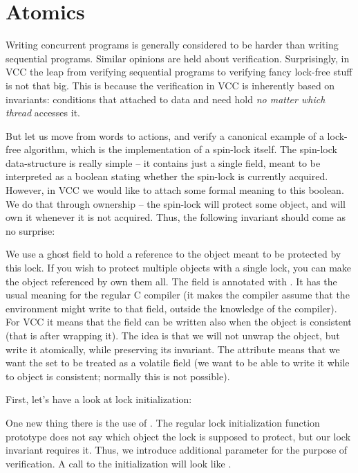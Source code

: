 \section{Atomics}
\label{sect:concurrency}

Writing concurrent programs is generally considered to be harder than writing
sequential programs.
Similar opinions are held about verification.
Surprisingly, in VCC the leap from verifying sequential programs to
verifying fancy lock-free stuff is not that big.
This is because the verification in VCC is inherently based on invariants:
conditions that attached to data and need hold \emph{no matter which thread}
accesses it.

But let us move from words to actions, and verify a canonical example
of a lock-free algorithm, which is the implementation of a spin-lock itself.
The spin-lock data-structure is really simple -- it contains just a single
field, meant to be interpreted as a boolean stating whether the spin-lock
is currently acquired.
However, in VCC we would like to attach some formal meaning to this boolean.
We do that through ownership -- the spin-lock will protect some object,
and will own it whenever it is not acquired.
Thus, the following invariant should come as no surprise:


\noindent
We use a ghost field to hold a reference to the object meant to be protected
by this lock.
If you wish to protect multiple objects with a single lock, you can make
the object referenced by  own them all.
The  field is annotated with .
It has the usual meaning for the regular C compiler (\ie it makes the compiler
assume that the environment might write to that field, outside the knowledge
of the compiler).
For VCC it means that the field can be written also when the object is
consistent (that is after wrapping it).
The idea is that we will not unwrap the object, but write it atomically,
while preserving its invariant.
The attribute
 means that we want the \vcc{\owns} set
to be treated as a volatile field (\ie we want to be able to write
it while to object is consistent; normally this is not possible).

First, let's have a look at lock initialization:


\noindent
One new thing there is the use of .
The regular lock initialization function prototype does not say which
object the lock is supposed to protect, but our lock invariant requires it.
Thus, we introduce additional parameter for the purpose of verification.
A call to the initialization will look like .


